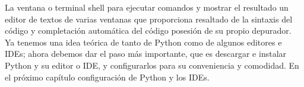 La ventana o terminal  shell para ejecutar comandos y mostrar el resultado un editor de textos de varias ventanas que proporciona resaltado de la sintaxis del código y completación automática del código  posesión de su propio depurador.\\


Ya tenemos una idea teórica de tanto de Python como de algunos editores e IDEs; ahora debemos dar el paso más importante, que es descargar e instalar Python y  su editor o IDE,  y configurarlos para su conveniencia y comodidad. En el próximo capítulo configuración de Python y los IDEs.



























 